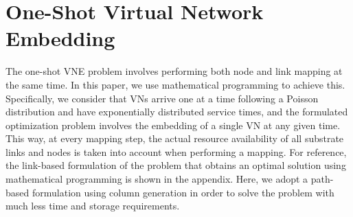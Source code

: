 \documentclass[journal]{IEEEtran}
\begin{document}
\section{One-Shot Virtual Network Embedding}
The one-shot \ac{VNE} problem involves performing both node and link mapping at the same time. In this paper, we use mathematical programming to achieve this. Specifically, we consider that VNs arrive one at a time following a Poisson distribution and have exponentially distributed service times, and the formulated optimization problem involves the embedding of a single VN at any given time. This way, at every mapping step, the actual resource availability of all substrate links and nodes is taken into account when performing a mapping. For reference, the link-based formulation of the problem that obtains an optimal solution using mathematical programming is shown in the appendix. Here, we adopt a path-based formulation using column generation in order to solve the problem with much less time and storage requirements.
\end{document}
